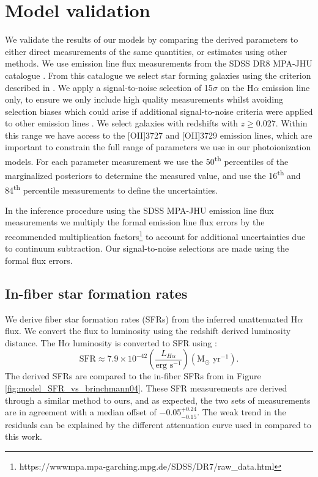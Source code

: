 \documentclass[fleqn,usenatbib]{mnras}
\begin{document}
\section{Model validation}
\label{sec:model_validation}
We validate the results of our models by comparing the derived parameters to either direct measurements of the same quantities, or estimates using other methods. We use emission line flux measurements from the SDSS DR8 MPA-JHU catalogue \citep{brinchmann2004, kauffmann2003a, tremonti2004}. From this catalogue we select star forming galaxies using the criterion described in \cite{kauffmann2003}. We apply a signal-to-noise selection of 15$\sigma$ on the H$\alpha$ emission line only, to ensure we only include high quality measurements whilst avoiding selection biases which could arise if additional signal-to-noise criteria were applied to other emission lines \citep{yates2012, kashino2016}. We select galaxies with redshifts with $z \geq 0.027$. Within this range we have access to the [OII]3727 and [OII]3729 emission lines, which are important to constrain the full range of parameters we use in our photoionization models. For each parameter measurement we use the 50\textsuperscript{th} percentiles of the marginalized posteriors to determine the measured value, and use the 16\textsuperscript{th} and 84\textsuperscript{th} percentile measurements to define the uncertainties.

In the inference procedure using the SDSS MPA-JHU emission line flux measurements we multiply the formal emission line flux errors by the recommended multiplication factors\footnote{https://wwwmpa.mpa-garching.mpg.de/SDSS/DR7/raw\_data.html} to account for additional uncertainties due to continuum subtraction. Our signal-to-noise selections are made using the formal flux errors.

\subsection{In-fiber star formation rates}
We derive fiber star formation rates (SFRs) from the inferred unattenuated H$\alpha$ flux. We convert the flux to luminosity using the redshift derived luminosity distance. The H$\alpha$ luminosity is converted to SFR using \cite{kennicutt1998}:
\begin{equation}
    \textrm{SFR} \approx 7.9 \times 10^{-42} \left( \frac{L_{H\alpha}}{\textrm{erg s}^{-1}} \right) (\textrm{M}_{\odot} \textrm{ yr}^{-1}) .
\end{equation}
The derived SFRs are compared to the in-fiber SFRs from \cite{brinchmann2004} in Figure \ref{fig:model_SFR_vs_brinchmann04}. These SFR measurements are derived through a similar method to ours, and as expected, the two sets of measurements are in agreement with a median offset of $-$0.05$_{-0.15}^{+0.24}$. The weak trend in the residuals can be explained by the different attenuation curve used in \cite{brinchmann2004} compared to this work.
\end{document}

